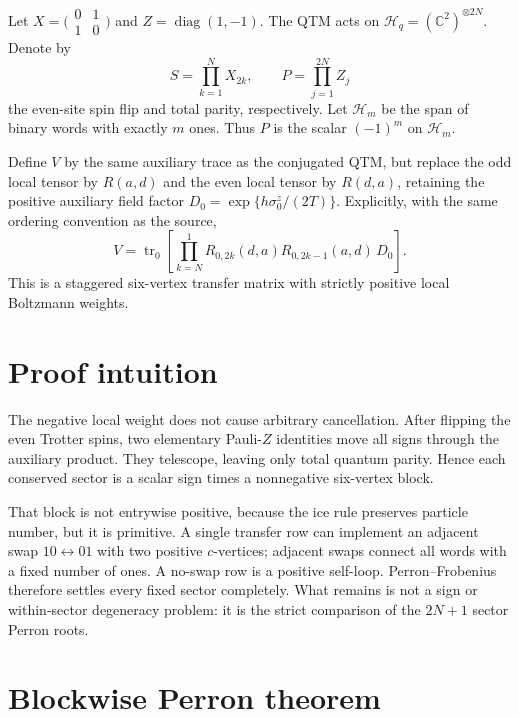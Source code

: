 \documentclass[11pt]{article}
\newcommand{\C}{\mathbb C}
\newcommand{\tr}{\operatorname{tr}}
\newcommand{\cH}{\mathcal H}
\begin{document}
Let $X=\bigl(\begin{smallmatrix}0&1\\1&0\end{smallmatrix}\bigr)$ and
$Z=\operatorname{diag}(1,-1)$.  The QTM acts on
$\cH_q=(\C^2)^{\otimes 2N}$.  Denote by
\[
 S=\prod_{k=1}^N X_{2k},\qquad P=\prod_{j=1}^{2N}Z_j
\]
the even-site spin flip and total parity, respectively.  Let $\cH_m$ be the
span of binary words with exactly $m$ ones.  Thus $P$ is the scalar $(-1)^m$
on $\cH_m$.

Define $V$ by the same auxiliary trace as the conjugated QTM, but replace the
odd local tensor by $R(a,d)$ and the even local tensor by $R(d,a)$, retaining
the positive auxiliary field factor
$D_0=\exp\{h\sigma_0^z/(2T)\}$.  Explicitly, with the same ordering convention
as the source,
\[
 V=\tr_0\!\left[
 \prod_{k=N}^{1}R_{0,2k}(d,a)R_{0,2k-1}(a,d)\,D_0
 \right].
 \tag{2.2}
\]
This is a staggered six-vertex transfer matrix with strictly positive local
Boltzmann weights.

\section{Proof intuition}

The negative local weight does not cause arbitrary cancellation.  After
flipping the even Trotter spins, two elementary Pauli-$Z$ identities move all
signs through the auxiliary product.  They telescope, leaving only total
quantum parity.  Hence each conserved sector is a scalar sign times a
nonnegative six-vertex block.

That block is not entrywise positive, because the ice rule preserves particle
number, but it is primitive.  A single transfer row can implement an adjacent
swap $10\leftrightarrow01$ with two positive $c$-vertices; adjacent swaps
connect all words with a fixed number of ones.  A no-swap row is a positive
self-loop.  Perron--Frobenius therefore settles every fixed sector completely.
What remains is not a sign or within-sector degeneracy problem: it is the
strict comparison of the $2N+1$ sector Perron roots.

\section{Blockwise Perron theorem}
\end{document}
